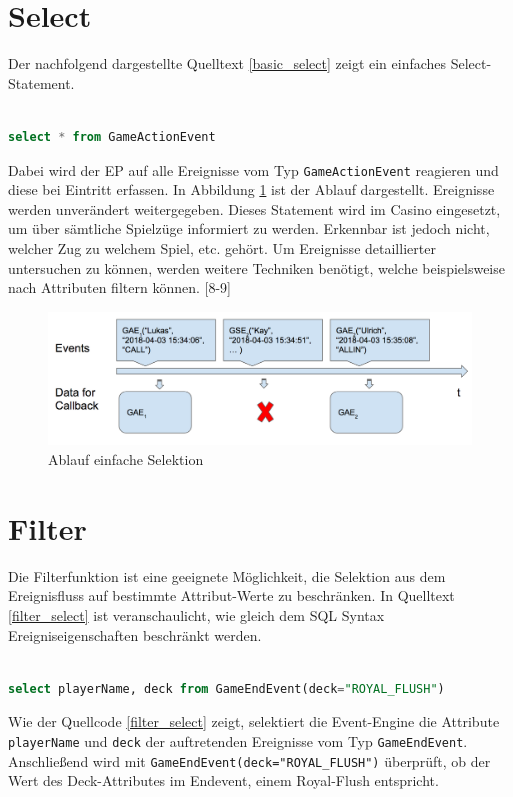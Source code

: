 \section{Select}

Der nachfolgend dargestellte Quelltext \ref{basic_select} zeigt ein einfaches Select-Statement.
\begin{lstlisting}[caption={Statement einfache Selektion},label=basic_select,captionpos=b,language=SQL]

select * from GameActionEvent

\end{lstlisting}
Dabei wird der \acf{EP} auf alle Ereignisse vom Typ \texttt{GameActionEvent} reagieren und diese bei Eintritt erfassen. 
In Abbildung \ref{basic_select_img} ist der Ablauf dargestellt. Ereignisse werden unverändert weitergegeben. Dieses Statement wird im Casino eingesetzt, um über sämtliche Spielzüge informiert zu werden. Erkennbar ist jedoch nicht, welcher Zug zu welchem Spiel, etc. gehört. Um Ereignisse detaillierter untersuchen zu können, werden weitere Techniken benötigt, welche beispielsweise nach Attributen filtern können.
\cite{EsperRef2018}[8-9]

\begin{figure}[h]
	\centering
	\includegraphics[width=\textwidth,height=\textheight, keepaspectratio]{images/statement_basic_select.png}
	\caption{Ablauf einfache Selektion}
	\label{basic_select_img}
\end{figure}

\section{Filter}

Die Filterfunktion ist eine geeignete Möglichkeit, die Selektion aus dem Ereignisfluss auf bestimmte Attribut-Werte zu beschränken. In Quelltext \ref{filter_select} ist veranschaulicht, wie gleich dem SQL Syntax Ereigniseigenschaften beschränkt werden.
\begin{lstlisting}[caption={Statement mit Filter},label=filter_select,captionpos=b,language=SQL]

select playerName, deck from GameEndEvent(deck="ROYAL_FLUSH")

\end{lstlisting}
Wie der Quellcode \ref{filter_select} zeigt, selektiert die Event-Engine die Attribute \texttt{playerName} und \texttt{deck} der auftretenden Ereignisse vom Typ \texttt{GameEndEvent}. Anschließend wird mit \texttt{GameEndEvent(deck="ROYAL\_FLUSH")} überprüft, ob der Wert des Deck-Attributes im Endevent, einem Royal-Flush entspricht.

